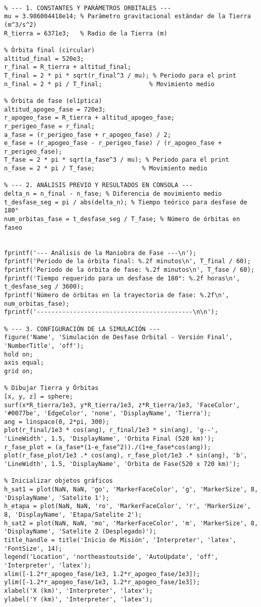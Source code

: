 \begin{verbatim}

% --- 1. CONSTANTES Y PARÁMETROS ORBITALES ---
mu = 3.986004418e14; % Parámetro gravitacional estándar de la Tierra (m^3/s^2)
R_tierra = 6371e3;   % Radio de la Tierra (m)

% Órbita final (circular)
altitud_final = 520e3;
r_final = R_tierra + altitud_final;
T_final = 2 * pi * sqrt(r_final^3 / mu); % Periodo para el print
n_final = 2 * pi / T_final;             % Movimiento medio

% Órbita de fase (elíptica)
altitud_apogeo_fase = 720e3;
r_apogeo_fase = R_tierra + altitud_apogeo_fase;
r_perigeo_fase = r_final;
a_fase = (r_perigeo_fase + r_apogeo_fase) / 2;
e_fase = (r_apogeo_fase - r_perigeo_fase) / (r_apogeo_fase + r_perigeo_fase);
T_fase = 2 * pi * sqrt(a_fase^3 / mu); % Periodo para el print
n_fase = 2 * pi / T_fase;             % Movimiento medio

% --- 2. ANÁLISIS PREVIO Y RESULTADOS EN CONSOLA ---
delta_n = n_final - n_fase; % Diferencia de movimiento medio
t_desfase_seg = pi / abs(delta_n); % Tiempo teórico para desfase de 180°
num_orbitas_fase = t_desfase_seg / T_fase; % Número de órbitas en faseo


fprintf('--- Análisis de la Maniobra de Fase ---\n');
fprintf('Periodo de la órbita final: %.2f minutos\n', T_final / 60);
fprintf('Periodo de la órbita de fase: %.2f minutos\n', T_fase / 60);
fprintf('Tiempo requerido para un desfase de 180°: %.2f horas\n', t_desfase_seg / 3600);
fprintf('Número de órbitas en la trayectoria de fase: %.2f\n', num_orbitas_fase);
fprintf('-------------------------------------------\n\n');

% --- 3. CONFIGURACIÓN DE LA SIMULACIÓN ---
figure('Name', 'Simulación de Desfase Orbital - Versión Final', 'NumberTitle', 'off');
hold on;
axis equal;
grid on;

% Dibujar Tierra y Órbitas
[x, y, z] = sphere;
surf(x*R_tierra/1e3, y*R_tierra/1e3, z*R_tierra/1e3, 'FaceColor', '#0077be', 'EdgeColor', 'none', 'DisplayName', 'Tierra');
ang = linspace(0, 2*pi, 300);
plot(r_final/1e3 * cos(ang), r_final/1e3 * sin(ang), 'g--', 'LineWidth', 1.5, 'DisplayName', 'Orbita Final (520 km)');
r_fase_plot = (a_fase*(1-e_fase^2))./(1+e_fase*cos(ang));
plot(r_fase_plot/1e3 .* cos(ang), r_fase_plot/1e3 .* sin(ang), 'b', 'LineWidth', 1.5, 'DisplayName', 'Orbita de Fase(520 x 720 km)');

% Inicializar objetos gráficos
h_sat1 = plot(NaN, NaN, 'go', 'MarkerFaceColor', 'g', 'MarkerSize', 8, 'DisplayName', 'Satelite 1');
h_etapa = plot(NaN, NaN, 'ro', 'MarkerFaceColor', 'r', 'MarkerSize', 8, 'DisplayName', 'Etapa/Satelite 2');
h_sat2 = plot(NaN, NaN, 'mo', 'MarkerFaceColor', 'm', 'MarkerSize', 8, 'DisplayName', 'Satelite 2 (Desplegado)');
title_handle = title('Inicio de Misión', 'Interpreter', 'latex', 'FontSize', 14);
legend('Location', 'northeastoutside', 'AutoUpdate', 'off', 'Interpreter', 'latex');
xlim([-1.2*r_apogeo_fase/1e3, 1.2*r_apogeo_fase/1e3]);
ylim([-1.2*r_apogeo_fase/1e3, 1.2*r_apogeo_fase/1e3]);
xlabel('X (km)', 'Interpreter', 'latex');
ylabel('Y (km)', 'Interpreter', 'latex');


\end{verbatim}
